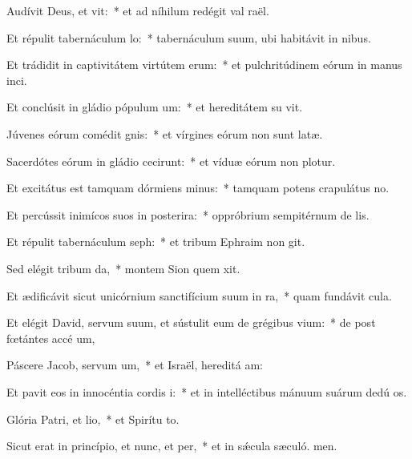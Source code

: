 \item Audívit Deus, et vit:~* et ad níhilum redégit val raël.
\item Et répulit tabernáculum lo:~* tabernáculum suum, ubi habitávit in nibus.
\item Et trádidit in captivitátem virtútem erum:~* et pulchritúdinem eórum in manus inci.
\item Et conclúsit in gládio pópulum um:~* et hereditátem su vit.
\item Júvenes eórum comédit gnis:~* et vírgines eórum non sunt latæ.
\item Sacerdótes eórum in gládio cecirunt:~* et víduæ eórum non plotur.
\item Et excitátus est tamquam dórmiens minus:~* tamquam potens crapulátus  no.
\item Et percússit inimícos suos in posterira:~* oppróbrium sempitérnum de lis.
\item Et répulit tabernáculum seph:~* et tribum Ephraim non git.
\item Sed elégit tribum da,~* montem Sion quem xit.
\item Et ædificávit sicut unicórnium sanctifícium suum in ra,~* quam fundávit  cula.
\item Et elégit David, servum suum, et sústulit eum de grégibus vium:~* de post fœtántes accé um,
\item Páscere Jacob, servum um,~* et Israël, hereditá am:
\item Et pavit eos in innocéntia cordis i:~* et in intelléctibus mánuum suárum dedú os.
\item Glória Patri, et lio,~* et Spirítu to.
\item Sicut erat in princípio, et nunc, et per,~* et in sǽcula sæculó. men.

